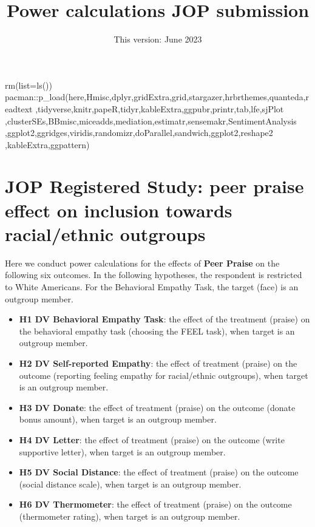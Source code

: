 \documentclass[
]{article}
\title{Power calculations JOP submission}
\author{}
\date{\vspace{-2.5em}This version: June 2023}
\newenvironment{Shaded}{\begin{snugshade}}{\end{snugshade}}
\newcommand{\AttributeTok}[1]{\textcolor[rgb]{0.77,0.63,0.00}{#1}}
\newcommand{\FunctionTok}[1]{\textcolor[rgb]{0.00,0.00,0.00}{#1}}
\newcommand{\NormalTok}[1]{#1}
\newcommand{\SpecialCharTok}[1]{\textcolor[rgb]{0.00,0.00,0.00}{#1}}
\begin{document}
\maketitle

\begin{Shaded}
\begin{Highlighting}[]
\FunctionTok{rm}\NormalTok{(}\AttributeTok{list=}\FunctionTok{ls}\NormalTok{())}
\NormalTok{pacman}\SpecialCharTok{::}\FunctionTok{p\_load}\NormalTok{(here,Hmisc,dplyr,gridExtra,grid,stargazer,hrbrthemes,quanteda,readtext}
\NormalTok{               ,tidyverse,knitr,papeR,tidyr,kableExtra,ggpubr,printr,tab,lfe,sjPlot}
\NormalTok{               ,clusterSEs,BBmisc,miceadds,mediation,estimatr,sensemakr,SentimentAnalysis}
\NormalTok{               ,ggplot2,ggridges,viridis,randomizr,doParallel,sandwich,ggplot2,reshape2}
\NormalTok{               ,kableExtra,ggpattern)}
\end{Highlighting}
\end{Shaded}

\hypertarget{jop-registered-study-peer-praise-effect-on-inclusion-towards-racialethnic-outgroups}{%
\section{JOP Registered Study: peer praise effect on inclusion towards
racial/ethnic
outgroups}\label{jop-registered-study-peer-praise-effect-on-inclusion-towards-racialethnic-outgroups}}

Here we conduct power calculations for the effects of \textbf{Peer
Praise} on the following six outcomes. In the following hypotheses, the
respondent is restricted to White Americans. For the Behavioral Empathy
Task, the target (face) is an outgroup member.

\begin{itemize}
\item
  \textbf{H1 DV Behavioral Empathy Task}: the effect of the treatment
  (praise) on the behavioral empathy task (choosing the FEEL task), when
  target is an outgroup member.
\item
  \textbf{H2 DV Self-reported Empathy}: the effect of treatment (praise)
  on the outcome (reporting feeling empathy for racial/ethnic
  outgroups), when target is an outgroup member.
\item
  \textbf{H3 DV Donate}: the effect of treatment (praise) on the outcome
  (donate bonus amount), when target is an outgroup member.
\item
  \textbf{H4 DV Letter}: the effect of treatment (praise) on the outcome
  (write supportive letter), when target is an outgroup member.
\item
  \textbf{H5 DV Social Distance}: the effect of treatment (praise) on
  the outcome (social distance scale), when target is an outgroup
  member.
\item
  \textbf{H6 DV Thermometer}: the effect of treatment (praise) on the
  outcome (thermometer rating), when target is an outgroup member.
\end{itemize}
\end{document}

